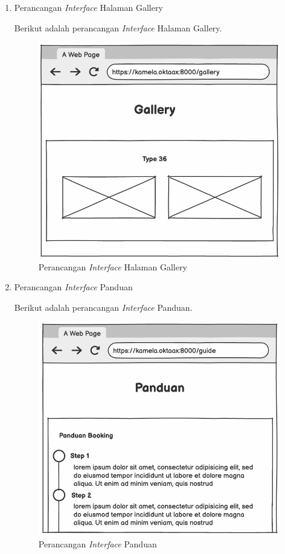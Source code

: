 \begin{enumerate}
        \item Perancangan \textit{Interface} Halaman Gallery
        \par Berikut adalah perancangan \textit{Interface} Halaman Gallery.
        \begin{figure}
            \centering
            \includegraphics[width=0.75\linewidth]{Wireframe/Gallery.png}
            \caption{Perancangan \textit{Interface} Halaman Gallery}
        \end{figure}
        
        \item Perancangan \textit{Interface} Panduan
        \par Berikut adalah perancangan \textit{Interface} Panduan.
        \begin{figure}
            \centering
            \includegraphics[width=0.72\linewidth]{Wireframe/Panduan.png}
            \caption{Perancangan \textit{Interface} Panduan}
        \end{figure}
        

\end{enumerate}
